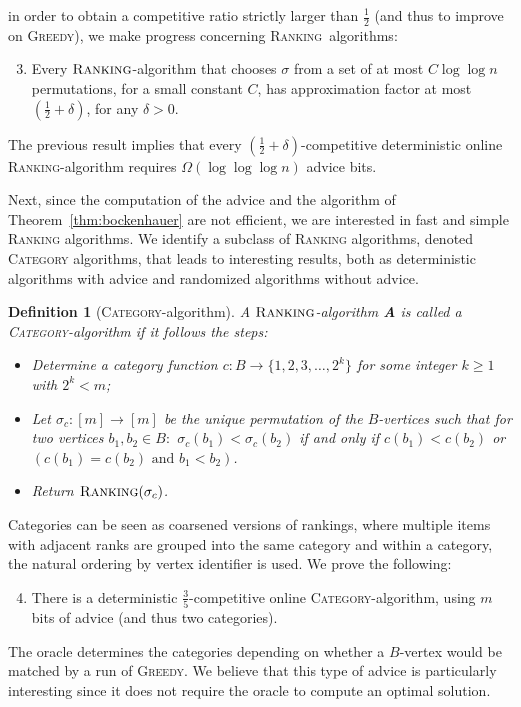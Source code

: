\documentclass[a4paper]{article}
\newcommand{\Rank}{\textsc{Ranking}}
\newtheorem{definition}{Definition}
\begin{document}
in order to obtain a competitive ratio strictly larger than $\frac{1}{2}$ (and thus to improve on \textsc{Greedy}),
we make progress concerning \Rank~algorithms:
\begin{enumerate}
\setcounter{enumi}{2}
 \item Every $\Rank$-algorithm that chooses $\sigma$ from a set of at most
 $C \log \log n$ permutations, for a small constant $C$, has approximation factor
 at most $(\frac{1}{2} + \delta)$, for any $\delta > 0$.
\end{enumerate}
The previous result implies that every $(\frac{1}{2} + \delta)$-competitive deterministic online
\textsc{Ranking}-algorithm requires $\Omega(\log \log \log n)$ advice bits.

Next, since the computation of the advice and the algorithm of Theorem~\ref{thm:bockenhauer} are not efficient,
we are interested in fast and simple \textsc{Ranking} algorithms. We identify a subclass of \textsc{Ranking} algorithms,
denoted \textsc{Category} algorithms, that leads to interesting results, both as deterministic algorithms with advice and
randomized algorithms without advice.

\begin{definition}[\textsc{Category}-algorithm]
 A $\Rank$-algorithm \textbf{A} is called a \textsc{Category}-algorithm if it follows the steps:
 \begin{itemize}
  \item Determine a category function $c: B \rightarrow \{1, 2, 3, \dots, 2^k\}$ for some integer $k \ge 1$ with $2^k < m$;
  \item Let $\sigma_c: [m] \rightarrow [m]$ be the unique permutation of the
$B$-vertices such that for two vertices $b_1, b_2 \in B: $ $\sigma_c(b_1) < \sigma_c(b_2)$ if
and only if $c(b_1) < c(b_2)$ or $(c(b_1) = c(b_2) \mbox{ and } b_1 < b_2)$.
 \item Return $\Rank(\sigma_c)$.
 \end{itemize}
\end{definition}
Categories can be seen as coarsened versions of rankings, where multiple items with adjacent ranks are
grouped into the same category and within a category, the natural ordering by vertex identifier is used.
We prove the following:
\begin{enumerate}
\setcounter{enumi}{3}\item
 There is a deterministic $\frac{3}{5}$-competitive online \textsc{Category}-algorithm,
 using $m$ bits of advice (and thus two categories).
\end{enumerate}
The oracle determines the categories depending on whether a $B$-vertex would be matched by a run of \textsc{Greedy}.
We believe that this type of advice is particularly interesting since it does not require the oracle to compute an
optimal solution.
\end{document}
